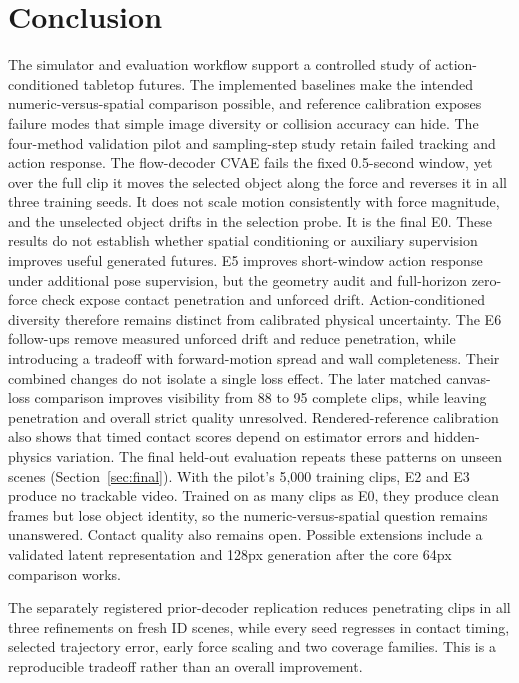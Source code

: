 \documentclass[11pt,a4paper]{article}
\begin{document}
\clearpage



\section{Conclusion}
The simulator and evaluation workflow support a controlled study of action-conditioned tabletop futures. The implemented baselines make the intended numeric-versus-spatial comparison possible, and reference calibration exposes failure modes that simple image diversity or collision accuracy can hide. The four-method validation pilot and sampling-step study retain failed tracking and action response. The flow-decoder CVAE fails the fixed 0.5-second window, yet over the full clip it moves the selected object along the force and reverses it in all three training seeds. It does not scale motion consistently with force magnitude, and the unselected object drifts in the selection probe. It is the final E0. These results do not establish whether spatial conditioning or auxiliary supervision improves useful generated futures. E5 improves short-window action response under additional pose supervision, but the geometry audit and full-horizon zero-force check expose contact penetration and unforced drift. Action-conditioned diversity therefore remains distinct from calibrated physical uncertainty. The E6 follow-ups remove measured unforced drift and reduce penetration, while introducing a tradeoff with forward-motion spread and wall completeness. Their combined changes do not isolate a single loss effect. The later matched canvas-loss comparison improves visibility from 88 to 95 complete clips, while leaving penetration and overall strict quality unresolved. Rendered-reference calibration also shows that timed contact scores depend on estimator errors and hidden-physics variation. The final held-out evaluation repeats these patterns on unseen scenes (Section~\ref{sec:final}). With the pilot's 5,000 training clips, E2 and E3 produce no trackable video. Trained on as many clips as E0, they produce clean frames but lose object identity, so the numeric-versus-spatial question remains unanswered. Contact quality also remains open. Possible extensions include a validated latent representation and 128px generation after the core 64px comparison works.

The separately registered prior-decoder replication reduces penetrating clips in all three refinements on fresh ID scenes, while every seed regresses in contact timing, selected trajectory error, early force scaling and two coverage families. This is a reproducible tradeoff rather than an overall improvement.
\end{document}
